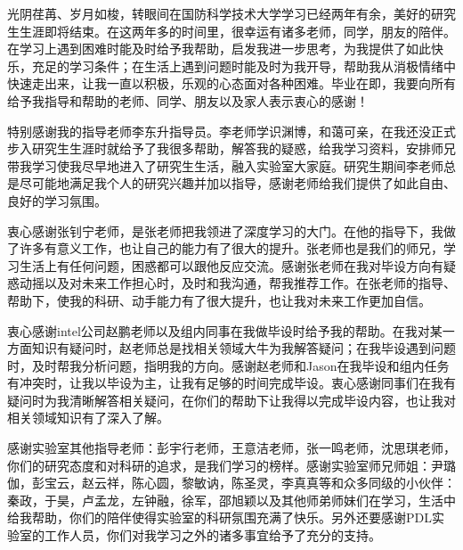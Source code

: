 

\begin{ack}
  光阴荏苒、岁月如梭，转眼间在国防科学技术大学学习已经两年有余，美好的研究生生涯即将结束。在这两年多的时间里，很幸运有诸多老师，同学，朋友的陪伴。在学习上遇到困难时能及时给予我帮助，启发我进一步思考，为我提供了如此快乐，充足的学习条件；在生活上遇到问题时能及时为我开导，帮助我从消极情绪中快速走出来，让我一直以积极，乐观的心态面对各种困难。毕业在即，我要向所有给予我指导和帮助的老师、同学、朋友以及家人表示衷心的感谢！
  
  特别感谢我的指导老师李东升指导员。李老师学识渊博，和蔼可亲，在我还没正式步入研究生生涯时就给予了我很多帮助，解答我的疑惑，给我学习资料，安排师兄带我学习使我尽早地进入了研究生生活，融入实验室大家庭。研究生期间李老师总是尽可能地满足我个人的研究兴趣并加以指导，感谢老师给我们提供了如此自由、良好的学习氛围。
  
  衷心感谢张钊宁老师，是张老师把我领进了深度学习的大门。在他的指导下，我做了许多有意义工作，也让自己的能力有了很大的提升。张老师也是我们的师兄，学习生活上有任何问题，困惑都可以跟他反应交流。感谢张老师在我对毕设方向有疑惑动摇以及对未来工作担心时，及时和我沟通，帮我推荐工作。在张老师的指导、帮助下，使我的科研、动手能力有了很大提升，也让我对未来工作更加自信。
  
  衷心感谢intel公司赵鹏老师以及组内同事在我做毕设时给予我的帮助。在我对某一方面知识有疑问时，赵老师总是找相关领域大牛为我解答疑问；在我毕设遇到问题时，及时帮我分析问题，指明我的方向。感谢赵老师和Jason在我毕设和组内任务有冲突时，让我以毕设为主，让我有足够的时间完成毕设。衷心感谢同事们在我有疑问时为我清晰解答相关疑问，在你们的帮助下让我得以完成毕设内容，也让我对相关领域知识有了深入了解。
  
  感谢实验室其他指导老师：彭宇行老师，王意洁老师，张一鸣老师，沈思琪老师，你们的研究态度和对科研的追求，是我们学习的榜样。感谢实验室师兄师姐：尹璐伽，彭宝云，赵云祥，陈心圆，黎敏讷，陈圣灵，李真真等和众多同级的小伙伴：秦政，于昊，卢孟龙，左钟融，徐军，邵旭颖以及其他师弟师妹们在学习，生活中给我帮助，你们的陪伴使得实验室的科研氛围充满了快乐。另外还要感谢PDL实验室的工作人员，你们对我学习之外的诸多事宜给予了充分的支持。

\end{ack}
